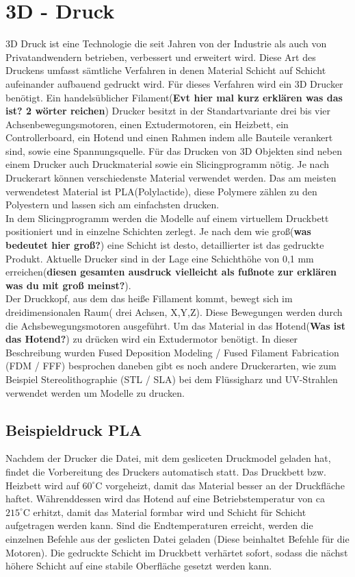 \documentclass[12pt,					%
							 oneside,			%
							 a4paper,			%
							 halfparskip,		%
							 liststotoc,			%
							 bibtotoc,			%
							 fleqn,				%
							 pointlessnumbers]	%
							 {scrreprt}
\begin{document}
\section{3D - Druck}
3D Druck ist eine Technologie die seit Jahren von der Industrie als auch von Privatandwendern betrieben, verbessert und erweitert wird. Diese Art des Druckens umfasst sämtliche Verfahren in denen Material Schicht auf Schicht aufeinander aufbauend gedruckt wird.
Für dieses Verfahren wird ein 3D Drucker benötigt. Ein handelsüblicher Filament(\textbf{Evt hier mal kurz erklären was das ist? 2 wörter reichen}) Drucker besitzt in der Standartvariante drei bis vier Achsenbewegungsmotoren, einen Extudermotoren, ein Heizbett, ein Controllerboard, ein Hotend und einen Rahmen indem alle Bauteile verankert sind, sowie eine Spannungsquelle.
Für das Drucken von 3D Objekten sind neben einem Drucker auch Druckmaterial sowie ein Slicingprogramm nötig. Je nach Druckerart können verschiedenste Material verwendet werden. Das am meisten verwendetest Material ist PLA(Polylactide), diese Polymere zählen zu den Polyestern und lassen sich am einfachsten drucken. \\
In dem Slicingprogramm werden die Modelle auf einem virtuellem Druckbett positioniert und in einzelne Schichten zerlegt. Je nach dem wie groß(\textbf{was bedeutet hier groß?}) eine Schicht ist desto, detaillierter ist das gedruckte Produkt. Aktuelle Drucker sind in der Lage eine Schichthöhe von 0,1 mm erreichen(\textbf{diesen gesamten ausdruck vielleicht als fußnote zur erklären was du mit groß meinst?}). \\
Der Druckkopf, aus dem das heiße Fillament kommt, bewegt sich im dreidimensionalen Raum( drei Achsen, X,Y,Z). Diese Bewegungen werden durch die Achsbewegungsmotoren ausgeführt. Um das Material in das Hotend(\textbf{Was ist das Hotend?}) zu drücken wird ein Extudermotor benötigt.
\newpage
In dieser Beschreibung wurden Fused Deposition Modeling / Fused Filament Fabrication (FDM / FFF) besprochen daneben gibt es noch andere Druckerarten, wie zum Beispiel Stereolithographie (STL / SLA) bei dem Flüssigharz und UV-Strahlen verwendet werden um Modelle zu drucken.
\subsection{Beispieldruck PLA}
Nachdem der Drucker die Datei, mit dem gesliceten Druckmodel geladen hat, findet die Vorbereitung des Druckers automatisch statt.
Das Druckbett bzw. Heizbett wird auf $60^\circ\text{C}$ vorgeheizt, damit das Material besser an der Druckfläche haftet.
Währenddessen wird das Hotend auf eine Betriebstemperatur von ca  $215^\circ\text{C}$ erhitzt, damit das Material formbar wird und Schicht für Schicht aufgetragen werden kann.
Sind die Endtemperaturen erreicht, werden die einzelnen Befehle aus der geslicten Datei geladen (Diese beinhaltet Befehle für die Motoren).
Die gedruckte Schicht im Druckbett verhärtet sofort, sodass die nächst höhere Schicht auf eine stabile Oberfläche gesetzt werden kann.
\newpage
\end{document}
